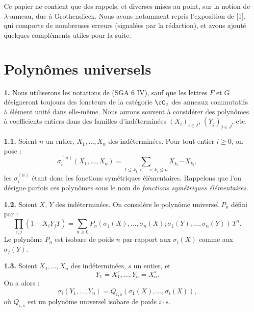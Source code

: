 \bigskip
\noindent Ce papier ne contient que des rappels, et diverses mises au point, sur la notion de $\lambda$-anneau, due \`a Grothendieck. Nous avons notamment repris l'exposition de [1], qui comporte de nombreuses erreurs (signal\'ees par la r\'edaction), et avons ajout\'e quelques compl\'ements utiles pour la suite.

\section{Polyn\^omes universels}

\noindent\textbf{1.} Nous utiliserons les notations de (SGA 6 IV), sauf que les lettres $F$ et $G$ d\'esigneront toujours des foncteurs de la cat\'egorie $\cC_\circ$ des anneaux commutatifs \`a \'el\'ement unit\'e dans elle-m\^eme. Nous aurons souvent \`a consid\'erer des polyn\^omes \`a coefficients entiers dans des familles d'ind\'etermin\'ees $(X_i)_{i \in I}$, $(Y_j)_{j \in J}$, etc.

\smallskip
\noindent\textbf{1.1.} Soient $n$ un entier, $X_1, \ldots, X_n$ des ind\'etermin\'ees. Pour tout entier $i \geq 0$, on pose :
\begin{equation}
\sigma_i^{(n)}(X_1, \ldots, X_n) = \sum_{1 \leq k_1 < \cdots < k_i \leq n} X_{k_1} \cdots X_{k_i},
\end{equation}
les $\sigma_i^{(n)}$ \'etant donc les fonctions sym\'etriques \'el\'ementaires. Rappelons que l'on d\'esigne parfois ces polyn\^omes sous le nom de \emph{fonctions sym\'etriques \'el\'ementaires}.

\smallskip
\noindent\textbf{1.2.} Soient $X$, $Y$ des ind\'etermin\'ees. On consid\'ere le polyn\^ome universel $P_n$ d\'efini par :
\begin{equation}
\prod_{i,j}(1 + X_i Y_j T) = \sum_{n \geq 0} P_n(\sigma_1(X), \ldots, \sigma_n(X); \sigma_1(Y), \ldots, \sigma_n(Y)) \, T^n.
\end{equation}
Le polyn\^ome $P_n$ est isobare de poids $n$ par rapport aux $\sigma_i(X)$ comme aux $\sigma_j(Y)$.

\smallskip
\noindent\textbf{1.3.} Soient $X_1, \ldots, X_n$ des ind\'etermin\'ees, $s$ un entier, et
\[
Y_1 = X_1^s, \ldots, Y_n = X_n^s.
\]
On a alors :
\begin{equation}
\sigma_i(Y_1, \ldots, Y_n) = Q_{i,s}(\sigma_1(X), \ldots, \sigma_i(X)),
\end{equation}
o\`u $Q_{i,s}$ est un polyn\^ome universel isobare de poids $i \cdot s$.

